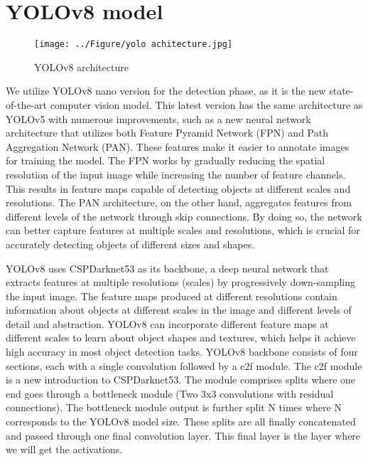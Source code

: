\documentclass[14pt]{extreport}
\begin{document}
\section{YOLOv8 model}
\begin{figure}[H]
    \begin{adjustwidth}{-100pt}{-100pt}
        \centering
        \captionsetup{justification=centering,margin=1.5cm}
        \texttt{[image: ../Figure/yolo achitecture.jpg]}
        \caption{YOLOv8 architecture}
        \label{fig:YOLOv8}
    \end{adjustwidth}
\end{figure}
We utilize YOLOv8 nano version for the detection phase, as it is the new state-of-the-art computer vision model. This latest version has the same architecture as YOLOv5 with numerous improvements, such as a new neural network architecture that utilizes both Feature Pyramid Network (FPN) and Path
Aggregation Network (PAN). These features make it easier to annotate images for training the model. The FPN works by gradually reducing the spatial resolution of the input image while increasing the number of feature channels. This results in feature maps capable of detecting objects at different scales and resolutions. The PAN architecture, on the other hand, aggregates features from different levels of the network through skip connections. By doing so, the network can better capture features at multiple scales and resolutions, which is crucial for accurately detecting objects of different sizes and shapes\cite{yolov1 to 8}.

YOLOv8 uses CSPDarknet53\cite{yolov3} as its backbone, a deep neural network that extracts features at multiple resolutions (scales) by progressively down-sampling the input image. The feature maps produced at different resolutions contain information about objects at different scales in the image and different
levels of detail and abstraction. YOLOv8 can incorporate different feature maps at different scales to learn about object shapes and textures, which helps it achieve high accuracy in most object detection tasks. YOLOv8 backbone consists of four sections, each with a single convolution followed by a c2f module\cite{yolov8}. The c2f module is a new introduction to CSPDarknet53. The module comprises splits where one end goes through a bottleneck module (Two 3x3 convolutions with residual connections). The bottleneck module output is further split N times where N corresponds to the YOLOv8 model size. These splits are all finally concatenated and passed through one final convolution layer. This final layer is the layer where we will get the activations.
\end{document}
